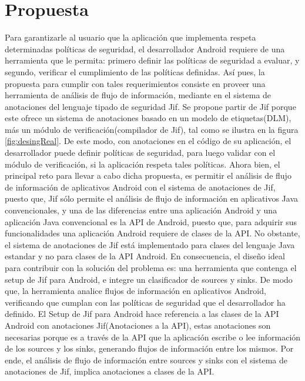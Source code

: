 \section{Propuesta}
Para garantizarle al usuario que la aplicación que implementa respeta
determinadas políticas de seguridad, el desarrollador Android requiere de una
herramienta que le permita: primero definir las políticas de seguridad a
evaluar, y segundo, verificar el cumplimiento de las políticas
definidas.\newline 
Así pues, la propuesta para cumplir con tales requerimientos consiste en proveer
una herramienta de análisis de flujo de información, mediante en el sistema de
anotaciones del lenguaje tipado de seguridad Jif. Se propone partir de Jif
porque este ofrece un sistema de anotaciones basado en un modelo de
etiquetas(DLM), más un módulo de verificación(compilador de Jif),
tal como se ilustra en la figura \ref{fig:desingReal}.
De este modo, con anotaciones en el código de su aplicación, el desarrollador
puede definir políticas de seguridad, para luego validar con el módulo de
verificación, si la aplicación respeta tales políticas.\newline 
Ahora bien, el principal reto para llevar a cabo dicha propuesta, es permitir el
análisis de flujo de información de aplicativos Android con el sistema de
anotaciones de Jif, puesto que, Jif sólo permite el análisis de flujo de
información en aplicativos Java convencionales, y una de las diferencias entre
una aplicación Android y una aplicación Java convencional es la API de Android,
puesto que, para adquirir sus funcionalidades una aplicación Android requiere de
clases de la API. No obstante, el sistema de anotaciones de Jif está
implementado para clases del lenguaje Java estandar y no para clases de la API
Android.\newline 
En consecuencia, el diseño ideal para contribuir con la solución del problema es:
una herramienta que contenga el setup de Jif para Android, e integre un clasificador de sources
y sinks. De modo que, la herramienta analice flujos de información en
aplicativos Android, verificando que cumplan con las políticas de seguridad que
el desarrollador ha definido.\newline 
El Setup de Jif para Android hace referencia a las clases de la API Android con
anotaciones Jif(Anotaciones a la API), estas anotaciones son necesarias porque
es a través de la API que la aplicación escribe o lee información de los sources
y los sinks, generando flujos de información entre los mismos. Por ende, el
análisis de flujo de información entre sources y sinks con el sistema de
anotaciones de Jif, implica anotaciones a clases de la API. 

